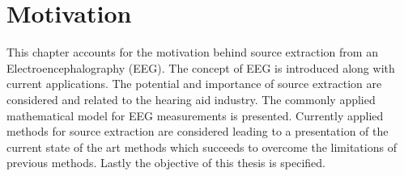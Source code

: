 \chapter{Motivation}\label{ch:motivation}
 This chapter accounts for the motivation behind source extraction from an Electroencephalography (EEG). The concept of EEG is introduced along with current applications. The potential and importance of source extraction are considered and related to the hearing aid industry. The commonly applied mathematical model for EEG measurements is presented. Currently applied methods for source extraction are considered leading to a presentation of the current state of the art methods which succeeds to overcome the limitations of previous methods. Lastly the objective of this thesis is specified.          


